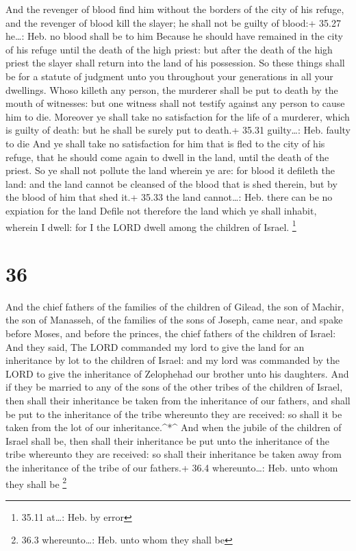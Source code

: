  And the revenger of blood find him without the borders of
the city of his refuge, and the revenger of blood kill the slayer; he
shall not be guilty of blood:+ 35.27 he\ldots: Heb. no blood shall be to
him  Because he should have remained in the city of his
refuge until the death of the high priest: but after the death of the
high priest the slayer shall return into the land of his possession.
 So these things shall be for a statute of judgment unto
you throughout your generations in all your dwellings. 
Whoso killeth any person, the murderer shall be put to death by the
mouth of witnesses: but one witness shall not testify against any person
to cause him to die.  Moreover ye shall take no
satisfaction for the life of a murderer, which is guilty of death: but
he shall be surely put to death.+ 35.31 guilty\ldots: Heb. faulty to die
 And ye shall take no satisfaction for him that is fled to
the city of his refuge, that he should come again to dwell in the land,
until the death of the priest.  So ye shall not pollute the
land wherein ye are: for blood it defileth the land: and the land cannot
be cleansed of the blood that is shed therein, but by the blood of him
that shed it.+ 35.33 the land cannot\ldots: Heb. there can be no
expiation for the land  Defile not therefore the land which
ye shall inhabit, wherein I dwell: for I the LORD dwell among the
children of Israel. \footnote{35.11 at\ldots: Heb. by error}

\hypertarget{section-35}{%
\section{36}\label{section-35}}

 And the chief fathers of the families of the children of
Gilead, the son of Machir, the son of Manasseh, of the families of the
sons of Joseph, came near, and spake before Moses, and before the
princes, the chief fathers of the children of Israel:  And
they said, The LORD commanded my lord to give the land for an
inheritance by lot to the children of Israel: and my lord was commanded
by the LORD to give the inheritance of Zelophehad our brother unto his
daughters.  And if they be married to any of the sons of the
other tribes of the children of Israel, then shall their inheritance be
taken from the inheritance of our fathers, and shall be put to the
inheritance of the tribe whereunto they are received: so shall it be
taken from the lot of our inheritance.\^{}*\^{}  And when
the jubile of the children of Israel shall be, then shall their
inheritance be put unto the inheritance of the tribe whereunto they are
received: so shall their inheritance be taken away from the inheritance
of the tribe of our fathers.+ 36.4 whereunto\ldots: Heb. unto whom they
shall be \footnote{36.3 whereunto\ldots: Heb. unto whom they shall be}

